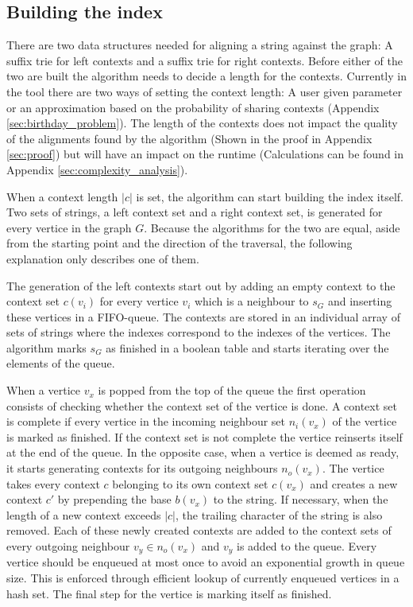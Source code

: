\documentclass[thesis.tex]{subfiles}
\begin{document}
\subsection{Building the index}
There are two data structures needed for aligning a string against the graph: A suffix trie for left contexts and a suffix trie for right contexts. Before either of the two are built the algorithm needs to decide a length for the contexts. Currently in the tool there are two ways of setting the context length: A user given parameter or an approximation based on the probability of sharing contexts (Appendix \ref{sec:birthday_problem}). The length of the contexts does not impact the quality of the alignments found by the algorithm (Shown in the proof in Appendix \ref{sec:proof}) but will have an impact on the runtime (Calculations can be found in Appendix \ref{sec:complexity_analysis}).\\
\par\noindent
When a context length $|c|$ is set, the algorithm can start building the index itself. Two sets of strings, a left context set and a right context set, is generated for every vertice in the graph $G$. Because the algorithms for the two are equal, aside from the starting point and the direction of the traversal, the following explanation only describes one of them.\\
\par\noindent
The generation of the left contexts start out by adding an empty context to the context set $c(v_i)$ for every vertice $v_i$ which is a neighbour to $s_G$ and inserting these vertices in a FIFO-queue. The contexts are stored in an individual array of sets of strings where the indexes correspond to the indexes of the vertices. The algorithm marks $s_G$ as finished in a boolean table and starts iterating over the elements of the queue.\\
\par\noindent
When a vertice $v_x$ is popped from the top of the queue the first operation consists of checking whether the context set of the vertice is done. A context set is complete if every vertice in the incoming neighbour set $n_i(v_x)$ of the vertice is marked as finished. If the context set is not complete the vertice reinserts itself at the end of the queue. In the opposite case, when a vertice is deemed as ready, it starts generating contexts for its outgoing neighbours $n_o(v_x)$. The vertice takes every context $c$ belonging to its own context set $c(v_x)$ and creates a new context $c'$ by prepending the base $b(v_x)$ to the string. If necessary, when the length of a new context exceeds $|c|$, the trailing character of the string is also removed. Each of these newly created contexts are added to the context sets of every outgoing neighbour $v_y \in n_o(v_x)$ and $v_y$ is added to the queue. Every vertice should be enqueued at most once to avoid an exponential growth in queue size. This is enforced through efficient lookup of currently enqueued vertices in a hash set. The final step for the vertice is marking itself as finished.\\
\end{document}
